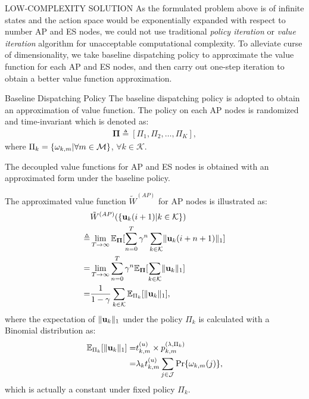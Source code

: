 \documentclass[10pt, conference, letterpaper]{IEEEtran}
\newcommand{\define}{\triangleq}
\renewcommand{\vec}{\mathbf}
\DeclarePairedDelimiter{\set}{\{}{\}}
\DeclarePairedDelimiter{\Inorm}{\|}{\|_1}
\newcommand{\apSet}{\mathcal{K}}
\newcommand{\esSet}{\mathcal{M}}
\newcommand{\jSpace}{\mathcal{J}}
\begin{document}
    \begin{section}{LOW-COMPLEXITY SOLUTION}
        \label{sec:algorithm}
        As the formulated problem above is of infinite states and the action space would be exponentially expanded with respect to number AP and ES nodes, we could not use traditional \emph{policy iteration} or \emph{value iteration} algorithm \cite{sutton1998introduction} for unacceptable computational complexity.
        To alleviate curse of dimensionality, we take baseline dispatching policy to approximate the value function for each AP and ES nodes, and then carry out one-step iteration to obtain a better value function approximation.

        \begin{subsection}{Baseline Dispatching Policy}
            The baseline dispatching policy is adopted to obtain an approximation of value function. The policy on each AP nodes is randomized and time-invariant which is denoted as:
            \begin{align}
                \vec{\Pi} \define [\Pi_1, \Pi_2, \dots, \Pi_K],
            \end{align}
            where $\Pi_k = \set{\omega_{k,m}|\forall m\in\esSet}$, $\forall k\in\apSet$.

            The decoupled value functions for AP and ES nodes is obtained with an approximated form under the baseline policy.
            
            The approximated value function $\tilde{W}^{(AP)}$ for AP nodes is illustrated as:
            \begin{align}
                &\tilde{W}^{(AP)}(\set{\vec{u}_k(i+1)|k\in\apSet})
                \nonumber\\
                \define& \lim_{T\to\infty} \mathbb{E}_{\vec{\Pi}}[\sum_{n=0}^{T} \gamma^{n} \sum_{k\in\apSet} \Inorm{\vec{u}_k(i+n+1)}]
                \nonumber\\
                =& \lim_{T\to\infty} \sum_{n=0}^{T} \gamma^{n} \mathbb{E}_{\vec{\Pi}}[\sum_{k\in\apSet} \Inorm{\vec{u}_k}]
                \nonumber\\
                =& \frac{1}{1-\gamma} \sum_{k\in\apSet} \mathbb{E}_{\Pi_k}[\Inorm{\vec{u}_k}],
            \end{align}
            where the expectation of $\Inorm{\vec{u}_k}$ under the policy $\Pi_k$ is calculated with a Binomial distribution as:
            \begin{align}
                \mathbb{E}_{\Pi_k}[\Inorm{\vec{u}_k}] =& t^{(u)}_{k,m} \times p^{(\lambda, \Pi_k)}_{k,m}
                \nonumber\\
                =& \lambda_k t^{(u)}_{k,m} \sum_{j\in\jSpace} \Pr\{\omega_{k,m}(j)\},
            \end{align}
            which is actually a constant under fixed policy $\Pi_k$.
            

\end{subsection}
\end{section}
\end{document}
